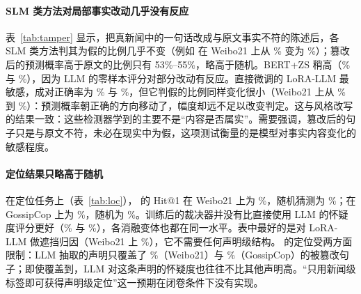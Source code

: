 \begin{table}[!htbp]
\centering\small
\caption{对单句事实篡改的敏感性（\%）。“判假”为被判为假的比例；成对正确率为篡改后样本的预测概率高于其原文的比例，50\% 相当于随机。}\label{tab:tamper}
\end{table}

\paragraph{SLM 类方法对局部事实改动几乎没有反应}
表~\ref{tab:tamper} 显示，把真新闻中的一句话改成与原文事实不符的陈述后，各 SLM 类方法判其为假的比例几乎不变（例如 \method{} 在 Weibo21 上从 \% 变为 \%）；篡改后的预测概率高于原文的比例只有 53\%--55\%，略高于随机。BERT+ZS 稍高（\% 与 \%），因为 LLM 的零样本评分对部分改动有反应。直接微调的 LoRA-LLM 最敏感，成对正确率为 \% 与 \%，但它判假的比例同样变化很小（Weibo21 上从 \% 到 \%）：预测概率朝正确的方向移动了，幅度却远不足以改变判定。这与风格改写的结果一致：这些检测器学到的主要不是“内容是否属实”。需要强调，篡改后的句子只是与原文不符，未必在现实中为假，这项测试衡量的是模型对事实内容变化的敏感程度。

\begin{table}[!htbp]
\centering\small
\caption{被篡改句子的定位结果（\%）。“单位”为方法给出分数的粒度；声明级分数通过声明所在的句子编号映射到句子。分隔线以下为 \method{} 与 \student{} 的消融变体。}\label{tab:loc}
\end{table}

\paragraph{定位结果只略高于随机}
在定位任务上（表~\ref{tab:loc}），\method{} 的 Hit@1 在 Weibo21 上为 \%，随机猜测为 \%；在 GossipCop 上为 \%，随机为 \%。训练后的裁决器并没有比直接使用 LLM 的怀疑度评分更好（\% 与 \%），各消融变体也都在同一水平。表中最好的是对 LoRA-LLM 做遮挡归因（Weibo21 上 \%），它不需要任何声明级结构。\method{} 的定位受两方面限制：LLM 抽取的声明只覆盖了 \%（Weibo21）与 \%（GossipCop）的被篡改句子；即使覆盖到，LLM 对这条声明的怀疑度也往往不比其他声明高。“只用新闻级标签即可获得声明级定位”这一预期在闭卷条件下没有实现。

